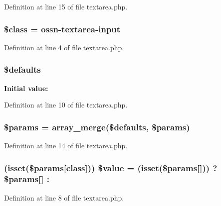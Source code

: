 Definition at line 15 of file textarea.\+php.

\subsubsection[{\texorpdfstring{\$class}{$class}}]{\setlength{\rightskip}{0pt plus 5cm}\$class = \textquotesingle{}ossn-\/textarea-\/{\bf input}\textquotesingle{}}\hypertarget{textarea_8php_a252ba022809910ea710a068fc1bab657}{}\label{textarea_8php_a252ba022809910ea710a068fc1bab657}


Definition at line 4 of file textarea.\+php.

\subsubsection[{\texorpdfstring{\$defaults}{$defaults}}]{\setlength{\rightskip}{0pt plus 5cm}\${\bf defaults}}\hypertarget{textarea_8php_a34ddfd723e30abea0a92b81f4443ac6a}{}\label{textarea_8php_a34ddfd723e30abea0a92b81f4443ac6a}
{\bfseries Initial value\+:}


Definition at line 10 of file textarea.\+php.

\subsubsection[{\texorpdfstring{\$params}{$params}}]{\setlength{\rightskip}{0pt plus 5cm}\$params = array\+\_\+merge(\${\bf defaults}, \$params)}\hypertarget{textarea_8php_afe68e6fbe7acfbffc0af0c84a1996466}{}\label{textarea_8php_afe68e6fbe7acfbffc0af0c84a1996466}


Definition at line 14 of file textarea.\+php.

\subsubsection[{\texorpdfstring{\$value}{$value}}]{ (isset(\$params\mbox{[}\textquotesingle{}class\textquotesingle{}\mbox{]})) \${\bf value} = (isset(\$params\mbox{[}\textquotesingle{}\mbox{]})) ? \$params\mbox{[}\textquotesingle{}\mbox{]} \+: \textquotesingle{}\textquotesingle{}}\hypertarget{textarea_8php_a5bd63f8afd4dd4ba86dcdf5618904298}{}\label{textarea_8php_a5bd63f8afd4dd4ba86dcdf5618904298}


Definition at line 8 of file textarea.\+php.

